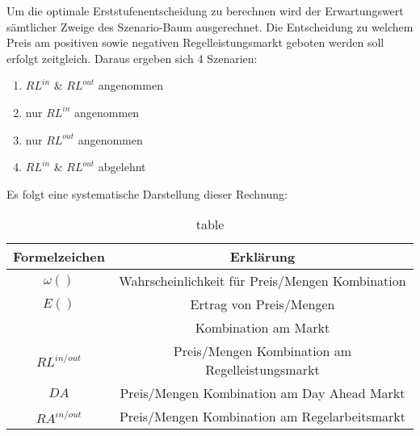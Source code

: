 Um die optimale Erststufenentscheidung zu berechnen wird der Erwartungswert sämtlicher Zweige des Szenario-Baum ausgerechnet.
Die Entscheidung zu welchem Preis am positiven sowie negativen Regelleistungsmarkt geboten werden soll erfolgt zeitgleich.
Daraus ergeben sich 4 Szenarien:
\begin{enumerate}
	\item $RL^{in}$ \& $RL^{out}$ angenommen
	\item nur $RL^{in}$ angenommen
	\item nur $RL^{out}$ angenommen
	\item $RL^{in}$ \& $RL^{out}$ abgelehnt
\end{enumerate}
Es folgt eine systematische Darstellung dieser Rechnung:
\begin{table}


	\begin{tabular}{|c|c|}
		\hline
		Formelzeichen & Erklärung                                       \\
		\hline
		$\omega()$    & Wahrscheinlichkeit für Preis/Mengen Kombination \\
		$E()$         & Ertrag von Preis/Mengen                         \\
		              & Kombination am Markt                            \\
		$RL^{in/out}$ & Preis/Mengen Kombination am Regelleistungsmarkt \\
		$DA$          & Preis/Mengen Kombination am Day Ahead Markt     \\
		$RA^{in/out}$ & Preis/Mengen Kombination am Regelarbeitsmarkt   \\
		\hline
	\end{tabular}
	\caption{table}
	\label{tab:my_label}
\end{table}


